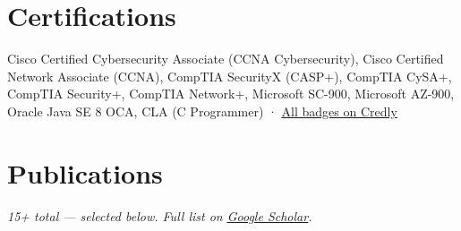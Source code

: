 \documentclass[10pt, a4paper]{article}
\begin{document}
\section*{Certifications}

\noindent Cisco Certified Cybersecurity Associate (CCNA Cybersecurity), Cisco Certified Network Associate (CCNA), CompTIA SecurityX (CASP+), CompTIA CySA+, CompTIA Security+, CompTIA Network+, Microsoft SC-900, Microsoft AZ-900, Oracle Java SE 8 OCA, CLA (C Programmer) · \href{https://www.credly.com/users/aditya-mitra.a830b75a/badges}{\underline{All badges on Credly}}

\section*{Publications}

\noindent\textit{15+ total --- selected below. Full list on \href{https://scholar.google.com/citations?user=oXPSCNUAAAAJ}{\underline{Google Scholar}}.}

\vspace{4pt}
\end{document}

